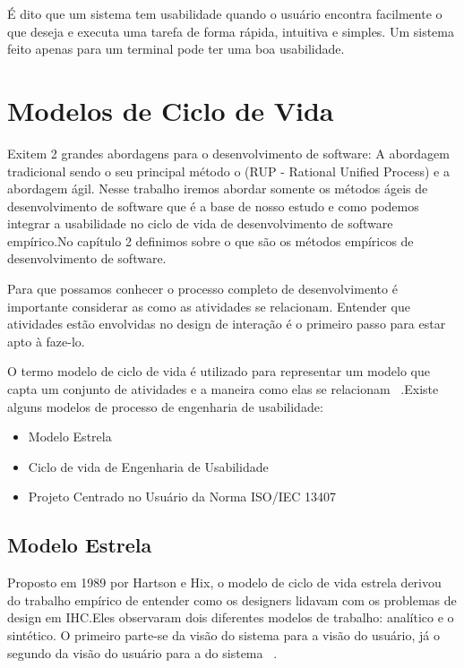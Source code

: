 É dito que um sistema tem usabilidade quando o usuário encontra facilmente o que deseja e executa uma tarefa de forma rápida, intuitiva e simples. Um sistema feito apenas para um terminal pode ter uma boa usabilidade.


\section{Modelos de Ciclo de Vida}

	Exitem 2 grandes abordagens para o desenvolvimento de software: A abordagem tradicional sendo o seu principal método o (RUP - Rational Unified Process) e a abordagem ágil. Nesse trabalho iremos abordar somente os métodos ágeis de desenvolvimento de software que é a base de nosso estudo e como podemos integrar a usabilidade no ciclo de vida de desenvolvimento de software empírico.No capítulo 2 definimos sobre o que são os métodos empíricos de desenvolvimento de software.

	Para que possamos conhecer o processo completo de desenvolvimento é importante considerar as como as atividades se relacionam. Entender que atividades estão envolvidas no design de interação é o primeiro passo para estar apto à faze-lo.

	O termo modelo de ciclo de vida é utilizado para representar um modelo que capta um conjunto de atividades e a maneira como elas se relacionam ~\cite{preece2005}.Existe alguns modelos de processo de engenharia de usabilidade:

\begin{itemize}
\item Modelo Estrela
\item Ciclo de vida de Engenharia de Usabilidade
\item Projeto Centrado no Usuário da Norma ISO/IEC 13407
\end{itemize}

\subsection{Modelo Estrela}

	Proposto em 1989 por Hartson e Hix, o modelo de ciclo de vida estrela derivou do trabalho empírico de entender como os designers lidavam com os problemas de design em IHC.Eles observaram dois diferentes modelos de trabalho: analítico e o sintético. O primeiro parte-se da visão do sistema para a visão do usuário, já o segundo da visão do usuário para a do sistema ~\cite{cybis2010}.


